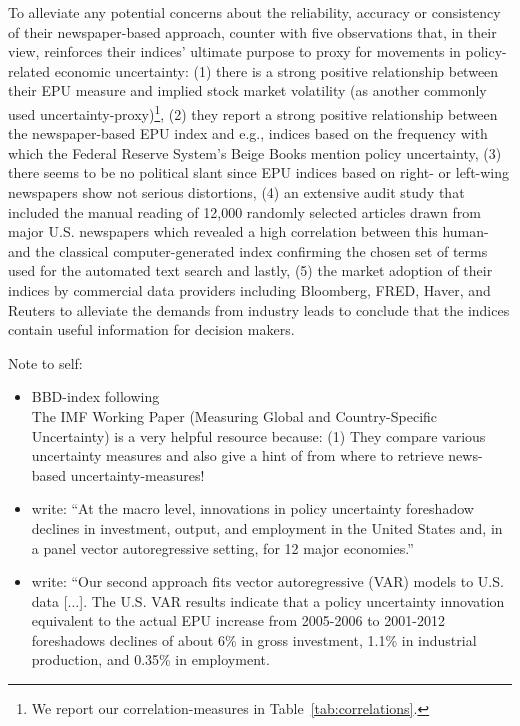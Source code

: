 \documentclass[a4paper,11pt,listof=nochaptergap,oneside,pointednumbers,bibtotoc,bigheadings,liststotoc]{scrbook}
\begin{document}
To alleviate any potential concerns about the reliability, accuracy or consistency of their newspaper-based approach, \citet[p. 1595]{bakeretal:15} counter with five observations that, in their view, reinforces their indices' ultimate purpose to proxy for movements in policy-related economic uncertainty: (1) there is a strong positive relationship between their EPU measure and implied stock market volatility (as another commonly used uncertainty-proxy)\footnote{We report our correlation-measures in Table~\ref{tab:correlations}.}, (2) they report a strong positive relationship between the newspaper-based EPU index and e.g., indices based on the frequency with which the Federal Reserve System's Beige Books mention policy uncertainty, (3) there seems to be no political slant since EPU indices based on right- or left-wing newspapers show not serious distortions, (4) an extensive audit study that included the manual reading of 12,000 randomly selected articles drawn from major U.S. newspapers which revealed a high correlation between this human- and the classical computer-generated index confirming the chosen set of terms used for the automated text search and lastly, (5) the market adoption of their indices by commercial data providers including Bloomberg, FRED, Haver, and Reuters to alleviate the demands from industry leads \citet{bakeretal:15} to conclude that the indices contain useful information for decision makers.



\begingroup
    \fontsize{8pt}{12pt}\selectfont
    Note to self:
\begin{itemize}
	\item  BBD-index following \citet{bakeretal:15}\\
The IMF Working Paper (Measuring Global and Country-Specific Uncertainty) is a very helpful resource because: (1) They compare various uncertainty measures and also give a hint of from where to retrieve news-based uncertainty-measures!
	\item \citet[p. 1593]{bakeretal:15} write: ``At the macro level, innovations in policy uncertainty foreshadow declines in investment, output, and employment in the United States and, in a panel vector autoregressive setting, for 12 major economies.''
	\item \citet[p. 1596]{bakeretal:15} write: ``Our second approach fits vector autoregressive (VAR) models to U.S. data [...]. The U.S. VAR results indicate that a policy uncertainty innovation equivalent to the actual EPU increase from 2005-2006 to 2001-2012 foreshadows declines of about 6\% in gross investment, 1.1\% in industrial production, and 0.35\% in employment.
\end{itemize}
\endgroup
\end{document}
